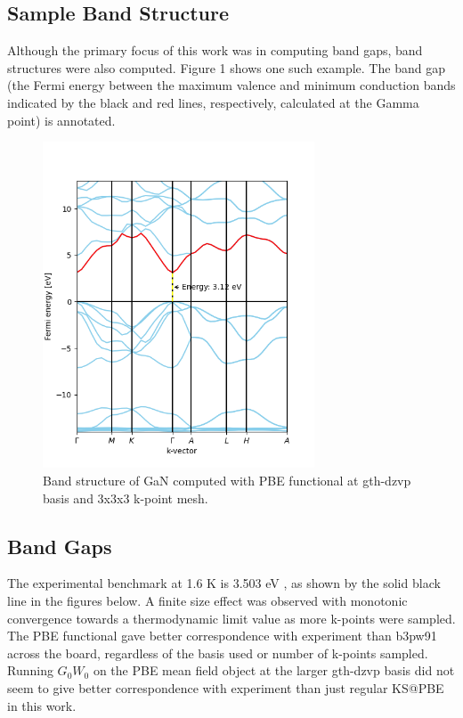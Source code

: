 \documentclass[12pt]{article}
\begin{document}
\subsection{Sample Band Structure}
Although the primary focus of this work was in computing band gaps, band structures were also computed. Figure 1 shows one such example. The band gap (the Fermi energy between the maximum valence and minimum conduction bands indicated by the black and red lines, respectively, calculated at the Gamma point) is annotated.
\begin{figure}
\centering
\includegraphics[width=0.72\textwidth]{pbe_dzvp_333_11-15.png}
\caption{Band structure of GaN computed with PBE functional at gth-dzvp basis and 3x3x3 k-point mesh.}
\end{figure}
\newpage

\subsection{Band Gaps}
The experimental benchmark at 1.6 K is 3.503 eV \autocite{madelung2004semiconductors}, as shown by the solid black line in the figures below. A finite size effect was observed with monotonic convergence towards a thermodynamic limit value as more k-points were sampled. The PBE functional gave better correspondence with experiment than b3pw91 across the board, regardless of the basis used or number of k-points sampled. Running $G_0W_0$ on the PBE mean field object at the larger gth-dzvp basis did not seem to give better correspondence with experiment than just regular KS@PBE in this work.
\end{document}
